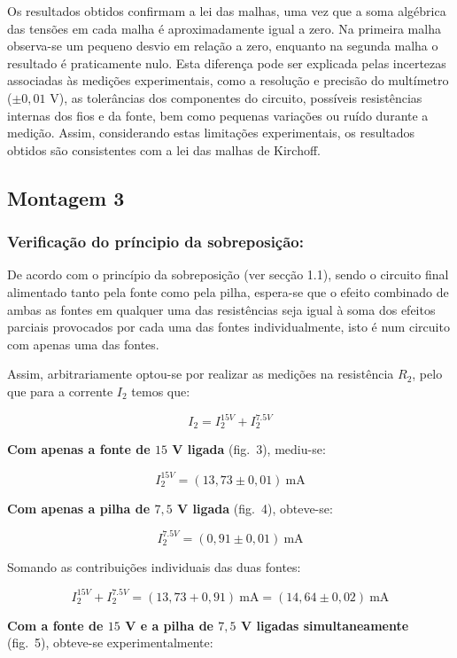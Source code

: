 Os resultados obtidos confirmam a lei das malhas, uma vez que a soma algébrica das tensões em cada malha é aproximadamente igual a zero. Na primeira malha observa-se um pequeno desvio em relação a zero, enquanto na segunda malha o resultado é praticamente nulo. Esta diferença pode ser explicada pelas incertezas associadas às medições experimentais, como a resolução e precisão do multímetro ($\pm 0{,}01$ V), as tolerâncias dos componentes do circuito, possíveis resistências internas dos fios e da fonte, bem como pequenas variações ou ruído durante a medição. Assim, considerando estas limitações experimentais, os resultados obtidos são consistentes com a lei das malhas de Kirchoff.

\vspace{1 cm}

\subsection{Montagem 3}

\subsubsection{Verificação do príncipio da sobreposição:}

De acordo com o princípio da sobreposição (ver secção 1.1), sendo o circuito final alimentado tanto pela fonte como pela pilha, espera-se que o efeito combinado de ambas as fontes em qualquer uma das resistências seja igual à soma dos efeitos parciais provocados por cada uma das fontes individualmente, isto é num circuito com apenas uma das fontes.


Assim, arbitrariamente optou-se por realizar as medições na resistência $R_2$, pelo que para a corrente $I_2$ temos que:

\[
	I_2 = I_2^{15V} + I_2^{7.5V}
\]

\textbf{Com apenas a fonte de $15$ V ligada} (fig.~3), mediu-se:

\[
	I_2^{15V} = (13,73 \pm 0,01)\ \text{mA}
\]

\textbf{Com apenas a pilha de $7,5$ V ligada} (fig.~4), obteve-se:

\[
	I_2^{7.5V} = (0,91 \pm 0,01)\ \text{mA}
\]

Somando as contribuições individuais das duas fontes:

\[
	I_2^{15V} + I_2^{7.5V}
	= (13,73 + 0,91)\ \text{mA}
	= (14,64 \pm 0,02)\ \text{mA}
\]

\textbf{Com a fonte de $15$ V e a pilha de $7,5$ V ligadas simultaneamente} (fig.~5), obteve-se experimentalmente:

